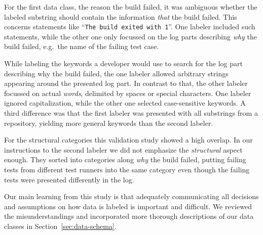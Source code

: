 \documentclass[\myrootdir/main.tex]{subfiles}
\begin{document}
For the first data class, the reason the build failed, it was ambiguous whether the labeled substring should contain the information \emph{that} the build failed.
This concerns statements like ``\texttt{The build exited with 1}''.
One labeler included such statements, while the other one only focussed on the log parts describing \emph{why} the build failed, e.g.\ the name of the failing test case.

While labeling the keywords a developer would use to search for the log part describing why the build failed, the one labeler allowed arbitrary strings appearing around the presented log part.
In contrast to that, the other labeler focussed on actual \emph{words}, delimited by spaces or special characters.
One labeler ignored capitalization, while the other one selected case-sensitive keywords.
A third difference was that the first labeler was presented with all substrings from a repository, yielding more general keywords than the second labeler.

For the structural categories this validation study showed a high overlap.
In our instructions to the second labeler we did not emphasize the \emph{structural} aspect enough.
They sorted into categories along \emph{why} the build failed, putting failing tests from different test runners into the same category even though the failing tests were presented differently in the log.

Our main learning from this study is that adequately communicating all decisions and assumptions on how data is labeled is important and difficult.
We reviewed the misunderstandings and incorporated more thorough descriptions of our data classes in Section~\ref{sec:data-schema}.
\end{document}
